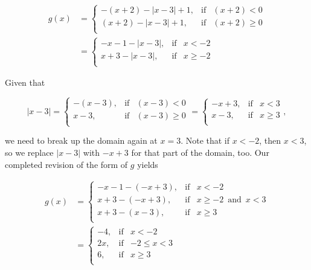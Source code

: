 {\begin{enumerate}
\begin{align*}
 g(x) &= \left\{ \begin{array}{rcl} -(x+2) - |x-3|+1, & \mbox{if} & (x+2) <0  \\ (x+2) - |x-3|+1, & \mbox{if} & (x+2) \geq 0 \\ \end{array} \right.\\
 & = \left\{ \begin{array}{rcl} -x-1 - |x-3|, & \mbox{if} & x<-2 \\ x+3-|x-3|, & \mbox{if} & x \geq -2 \\ \end{array} \right.
\end{align*}


Given that 

\[ |x-3| =\left\{ \begin{array}{rcl} -(x-3), & \mbox{if} & (x-3) <0  \\ x-3, & \mbox{if} & (x-3) \geq 0 \\ \end{array} \right. = \left\{ \begin{array}{rcl} -x+3, & \mbox{if} & x<3 \\ x-3, & \mbox{if} & x \geq 3 \\ \end{array} \right., \]


we need to break up the domain again at $x=3$.  Note that if $x < -2$, then $x < 3$, so we replace $|x-3|$ with $-x+3$ for that part of the domain, too.  Our completed revision of the form of $g$ yields 

\begin{align*}
 g(x) &= \left\{ \begin{array}{rcl} 
-x-1 - (-x+3), & \mbox{if} & x<-2 \\
x+3-(-x+3), & \mbox{if} & x \geq -2 \, \mbox{ and } \, x < 3 \\
x+3 - (x-3), & \mbox{if} & x \geq 3  \\  \end{array} \right.\\
& = \left\{ \begin{array}{rcl} -4, & \mbox{if} & x<-2 \\                                                                                    2x, & \mbox{if} &  -2 \leq x < 3 \\                                                                                6, & \mbox{if} & x \geq 3  \\                                                                                 \end{array} \right. 
\end{align*}
\end{enumerate}

}
